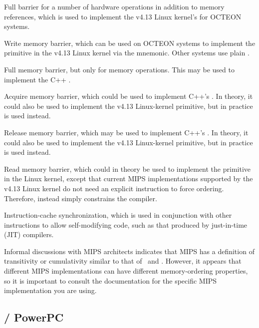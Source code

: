 \begin{description}[style=nextline]
\item[\tco{SYNC}]
	Full barrier for a number of hardware operations in addition
	to memory references, which is used to implement the v4.13
	Linux kernel's  for OCTEON systems.
\item[\tco{SYNC_WMB}]
	Write memory barrier, which can be used on OCTEON systems
	to implement the
	 primitive in the v4.13 Linux kernel via the
	 mnemonic.
	Other systems use plain .
\item[\tco{SYNC_MB}]
	Full memory barrier, but only for memory operations.
	This may be used to implement the
	C++ .
\item[\tco{SYNC_ACQUIRE}]
	Acquire memory barrier, which could be used to implement
	C++'s .
	In theory, it could also be used to implement the v4.13 Linux-kernel
	 primitive, but in practice
	 is used instead.
\item[\tco{SYNC_RELEASE}]
	Release memory barrier, which may be used to implement
	C++'s .
	In theory, it could also be used to implement the v4.13 Linux-kernel
	 primitive, but in practice
	 is used instead.
\item[\tco{SYNC_RMB}]
	Read memory barrier, which could in theory be used to implement the
	 primitive in the Linux kernel, except that current
	MIPS implementations supported by the v4.13 Linux kernel do not
	need an explicit instruction to force ordering.
	Therefore,  instead simply constrains the compiler.
\item[\tco{SYNCI}]
	Instruction-cache synchronization, which is used in conjunction with
	other instructions to allow self-modifying code, such as that produced
	by just-in-time (JIT) compilers.
\end{description}

Informal discussions with MIPS architects indicates that MIPS has a
definition of transitivity or cumulativity similar to that of
\ARM\ and \Power{}.
However, it appears that different MIPS implementations can have
different memory-ordering properties, so it is important to consult
the documentation for the specific MIPS implementation you are using.

\subsection{\Power{} / PowerPC}
\label{sec:memorder:POWER / PowerPC}


